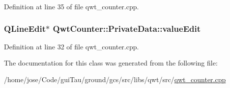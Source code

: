 Definition at line 35 of file qwt\-\_\-counter.\-cpp.

\hypertarget{class_qwt_counter_1_1_private_data_af950175bf792a26e9b447a24f8bf705c}{
\subsubsection[{value\-Edit}]{\setlength{\rightskip}{0pt plus 5cm}Q\-Line\-Edit$\ast$ Qwt\-Counter\-::\-Private\-Data\-::value\-Edit}}\label{class_qwt_counter_1_1_private_data_af950175bf792a26e9b447a24f8bf705c}


Definition at line 32 of file qwt\-\_\-counter.\-cpp.



The documentation for this class was generated from the following file\-:\begin{DoxyCompactItemize}
\item 
/home/jose/\-Code/gui\-Tau/ground/gcs/src/libs/qwt/src/\hyperlink{qwt__counter_8cpp}{qwt\-\_\-counter.\-cpp}\end{DoxyCompactItemize}
